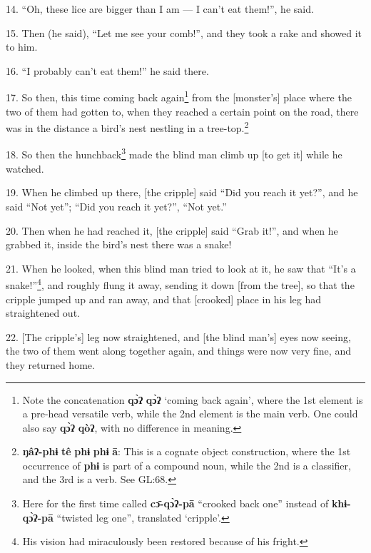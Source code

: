 14. ``Oh, these lice are bigger than I am --- I can't eat them!'', he said.

15. Then (he said), ``Let me see your comb!'', and they took a rake and showed it
to him.

16. ``I probably can't eat them!'' he said there.

17. So then, this time coming back again\footnote{Note the concatenation \textbf{qɔ̀ʔ} \textbf{qɔ̀ʔ} `coming back again', where the 1st element is a pre-head versatile verb, while the 2nd element is the main verb. One could also say \textbf{qɔ̀ʔ} \textbf{qòʔ}, with no difference in meaning.} from the [monster's] place where the
two of them had gotten to, when they reached a certain point on the road, there
was in the distance a bird's nest nestling in a tree-top.\footnote{\textbf{ŋâʔ-phɨ} \textbf{tê} \textbf{phɨ} \textbf{phɨ} \textbf{ā}: This is a cognate object construction, where the 1st occurrence of \textbf{phɨ} is part of a compound noun, while the 2nd is a classifier, and the 3rd is a verb. See GL:68.}

18. So then the hunchback\footnote{Here for the first time called \textbf{cɔ̄-qɔ̀ʔ-pā} ``crooked back one'' instead of \textbf{khɨ-qɔ̀ʔ-pā} ``twisted leg one'', translated `cripple'.} made the blind man climb up [to get it] while he watched.

19. When he climbed up there, [the cripple] said ``Did you reach it yet?'', and
he said ``Not yet''; ``Did you reach it yet?'', ``Not yet.''

20. Then when he had reached it, [the cripple] said ``Grab it!'', and when he grabbed
it, inside the bird's nest there was a snake!

21. When he looked, when this blind man tried to look at it, he saw that ``It's
a snake!''\footnote{His vision had miraculously been restored because of his fright.}, and roughly flung it away, sending it down [from the tree], so that
the cripple jumped up and ran away, and that [crooked] place in his leg had straightened
out.

22. [The cripple's] leg now straightened, and [the blind man's] eyes now seeing,
the two of them went along together again, and things were now very fine, and they
returned home.

